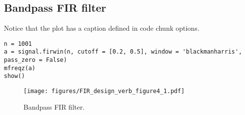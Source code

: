 \documentclass[a4paper,11pt,final]{article}
\begin{document}
\subsection{Bandpass FIR filter}

Notice that the plot has a caption defined in code chunk options.



\begin{verbatim}
n = 1001
a = signal.firwin(n, cutoff = [0.2, 0.5], window = 'blackmanharris', pass_zero = False)
mfreqz(a)
show()
\end{verbatim}
\begin{figure}[htpb]
\center
\texttt{[image: figures/FIR\_design\_verb\_figure4\_1.pdf]}
\caption{Bandpass FIR filter.}
\label{fig:None}
\end{figure}
\end{document}
